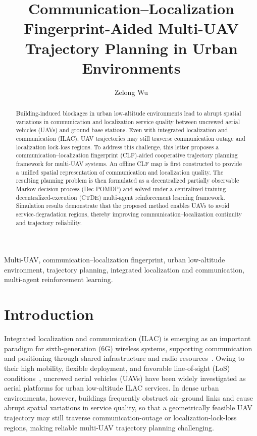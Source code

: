 \documentclass[lettersize,journal]{IEEEtran}
\begin{document}
\title{Communication--Localization Fingerprint-Aided Multi-UAV Trajectory Planning in Urban Environments}

\author{Zelong Wu}

\maketitle

\begin{abstract}
Building-induced blockages in urban low-altitude environments lead to abrupt spatial variations in communication and localization service quality between uncrewed aerial vehicles (UAVs) and ground base stations. Even with integrated localization and communication (ILAC), UAV trajectories may still traverse communication outage and localization lock-loss regions. To address this challenge, this letter proposes a communication--localization fingerprint (CLF)-aided cooperative trajectory planning framework for multi-UAV systems. An offline CLF map is first constructed to provide a unified spatial representation of communication and localization quality. The resulting planning problem is then formulated as a decentralized partially observable Markov decision process (Dec-POMDP) and solved under a centralized-training decentralized-execution (CTDE) multi-agent reinforcement learning framework. Simulation results demonstrate that the proposed method enables UAVs to avoid service-degradation regions, thereby improving communication--localization continuity and trajectory reliability.
\end{abstract}

\begin{IEEEkeywords}
Multi-UAV, communication--localization fingerprint, urban low-altitude environment, trajectory planning, integrated localization and communication, multi-agent reinforcement learning.
\end{IEEEkeywords}

\section{Introduction}

Integrated localization and communication (ILAC) is emerging as an important paradigm for sixth-generation (6G) wireless systems, supporting communication and positioning through shared infrastructure and radio resources~\cite{ref1}. Owing to their high mobility, flexible deployment, and favorable line-of-sight (LoS) conditions~\cite{ref2,ref3,ref4,ref5,ref6}, uncrewed aerial vehicles (UAVs) have been widely investigated as aerial platforms for urban low-altitude ILAC services. In dense urban environments, however, buildings frequently obstruct air--ground links and cause abrupt spatial variations in service quality, so that a geometrically feasible UAV trajectory may still traverse communication-outage or localization-lock-loss regions, making reliable multi-UAV trajectory planning challenging.
\end{document}
